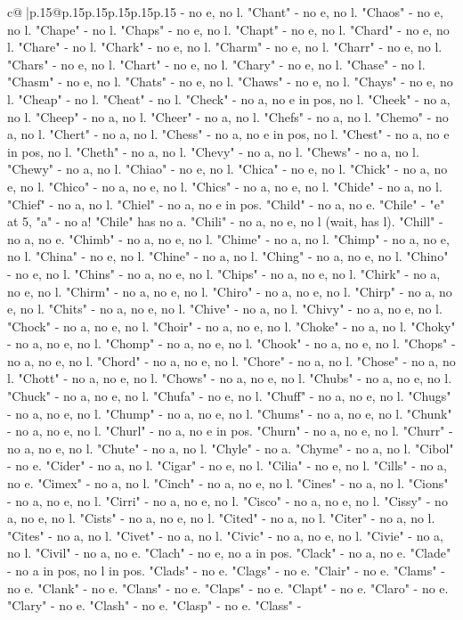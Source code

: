\documentclass{article}
\begin{document}
{\begin{supertabular}{c@{$\;$}|p{.15\linewidth}@{}p{.15\linewidth}p{.15\linewidth}p{.15\linewidth}p{.15\linewidth}p{.15\linewidth}}
{{{{-} no e, no l. "Chant" {-} no e, no l. "Chaos" {-} no e, no l. "Chape" {-} no l. "Chaps" {-} no e, no l. "Chapt" {-} no e, no l. "Chard" {-} no e, no l. "Chare" {-} no l. "Chark" {-} no e, no l. "Charm" {-} no e, no l. "Charr" {-} no e, no l. "Chars" {-} no e, no l. "Chart" {-} no e, no l. "Chary" {-} no e, no l. "Chase" {-} no l. "Chasm" {-} no e, no l. "Chats" {-} no e, no l. "Chaws" {-} no e, no l. "Chays" {-} no e, no l. "Cheap" {-} no l. "Cheat" {-} no l. "Check" {-} no a, no e in pos, no l. "Cheek" {-} no a, no l. "Cheep" {-} no a, no l. "Cheer" {-} no a, no l. "Chefs" {-} no a, no l. "Chemo" {-} no a, no l. "Chert" {-} no a, no l. "Chess" {-} no a, no e in pos, no l. "Chest" {-} no a, no e in pos, no l. "Cheth" {-} no a, no l. "Chevy" {-} no a, no l. "Chews" {-} no a, no l. "Chewy" {-} no a, no l. "Chiao" {-} no e, no l. "Chica" {-} no e, no l. "Chick" {-} no a, no e, no l. "Chico" {-} no a, no e, no l. "Chics" {-} no a, no e, no l. "Chide" {-} no a, no l. "Chief" {-} no a, no l. "Chiel" {-} no a, no e in pos. "Child" {-} no a, no e. "Chile" {-} "e" at 5, "a" {-} no a! "Chile" has no a. "Chili" {-} no a, no e, no l (wait, has l). "Chill" {-} no a, no e. "Chimb" {-} no a, no e, no l. "Chime" {-} no a, no l. "Chimp" {-} no a, no e, no l. "China" {-} no e, no l. "Chine" {-} no a, no l. "Ching" {-} no a, no e, no l. "Chino" {-} no e, no l. "Chins" {-} no a, no e, no l. "Chips" {-} no a, no e, no l. "Chirk" {-} no a, no e, no l. "Chirm" {-} no a, no e, no l. "Chiro" {-} no a, no e, no l. "Chirp" {-} no a, no e, no l. "Chits" {-} no a, no e, no l. "Chive" {-} no a, no l. "Chivy" {-} no a, no e, no l. "Chock" {-} no a, no e, no l. "Choir" {-} no a, no e, no l. "Choke" {-} no a, no l. "Choky" {-} no a, no e, no l. "Chomp" {-} no a, no e, no l. "Chook" {-} no a, no e, no l. "Chops" {-} no a, no e, no l. "Chord" {-} no a, no e, no l. "Chore" {-} no a, no l. "Chose" {-} no a, no l. "Chott" {-} no a, no e, no l. "Chows" {-} no a, no e, no l. "Chubs" {-} no a, no e, no l. "Chuck" {-} no a, no e, no l. "Chufa" {-} no e, no l. "Chuff" {-} no a, no e, no l. "Chugs" {-} no a, no e, no l. "Chump" {-} no a, no e, no l. "Chums" {-} no a, no e, no l. "Chunk" {-} no a, no e, no l. "Churl" {-} no a, no e in pos. "Churn" {-} no a, no e, no l. "Churr" {-} no a, no e, no l. "Chute" {-} no a, no l. "Chyle" {-} no a. "Chyme" {-} no a, no l. "Cibol" {-} no e. "Cider" {-} no a, no l. "Cigar" {-} no e, no l. "Cilia" {-} no e, no l. "Cills" {-} no a, no e. "Cimex" {-} no a, no l. "Cinch" {-} no a, no e, no l. "Cines" {-} no a, no l. "Cions" {-} no a, no e, no l. "Cirri" {-} no a, no e, no l. "Cisco" {-} no a, no e, no l. "Cissy" {-} no a, no e, no l. "Cists" {-} no a, no e, no l. "Cited" {-} no a, no l. "Citer" {-} no a, no l. "Cites" {-} no a, no l. "Civet" {-} no a, no l. "Civic" {-} no a, no e, no l. "Civie" {-} no a, no l. "Civil" {-} no a, no e. "Clach" {-} no e, no a in pos. "Clack" {-} no a, no e. "Clade" {-} no a in pos, no l in pos. "Clads" {-} no e. "Clags" {-} no e. "Clair" {-} no e. "Clams" {-} no e. "Clank" {-} no e. "Clans" {-} no e. "Claps" {-} no e. "Clapt" {-} no e. "Claro" {-} no e. "Clary" {-} no e. "Clash" {-} no e. "Clasp" {-} no e. "Class" {-} }}}
\end{supertabular}}
\end{document}
